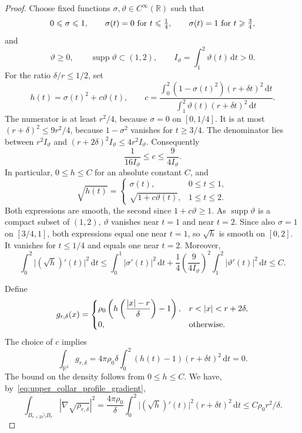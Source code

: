 \documentclass[final,reqno]{amsart}
\DeclareMathOperator{\supp}{supp}
\theoremstyle{remark}
\theoremstyle{definition}
\renewcommand{\le}{\leqslant}
\renewcommand{\ge}{\geqslant}
\newcommand{\RR}{\mathbb{R}}
\begin{document}
\begin{proof}
Choose fixed functions $\sigma,\vartheta\in C^\infty(\RR)$ such that
\[
0\le \sigma\le1,
\qquad \sigma(t)=0\ \hbox{for }t\le\tfrac14,
\qquad \sigma(t)=1\ \hbox{for }t\ge\tfrac34,
\]
and
\[
\vartheta\ge0,
\qquad \supp\vartheta\subset(1,2),
\qquad I_\vartheta=\int_1^2\vartheta(t)\,\mathrm dt>0.
\]
For the ratio $\delta/r\le1/2$, set
\begin{equation}\label{eq:upper_collar_coefficient}
 h(t)=\sigma(t)^2+c\vartheta(t),
 \qquad
 c=
 \frac{\displaystyle\int_0^2(1-\sigma(t)^2)(r+\delta t)^2\,\mathrm dt}
 {\displaystyle\int_1^2\vartheta(t)(r+\delta t)^2\,\mathrm dt}.
\end{equation}
The numerator is at least $r^2/4$, because $\sigma=0$ on $[0,1/4]$. It is at most $(r+\delta)^2\le9r^2/4$, because $1-\sigma^2$ vanishes for $t\ge3/4$. The denominator lies between $r^2I_\vartheta$ and $(r+2\delta)^2I_\vartheta\le4r^2I_\vartheta$. Consequently
\begin{equation}\label{eq:upper_collar_uniform_coefficient}
\frac1{16I_\vartheta}\le c\le\frac9{4I_\vartheta}.
\end{equation}
In particular, $0\le h\le C$ for an absolute constant $C$, and
\[
\sqrt{h(t)}=
\begin{cases}
\sigma(t),&0\le t\le1,\\
\sqrt{1+c\vartheta(t)},&1\le t\le2.
\end{cases}
\]
Both expressions are smooth, the second since $1+c\vartheta\ge1$. As $\supp\vartheta$ is a compact subset of $(1,2)$, $\vartheta$ vanishes near $t=1$ and near $t=2$. Since also $\sigma=1$ on $[3/4,1]$, both expressions equal one near $t=1$, so $\sqrt h$ is smooth on $[0,2]$. It vanishes for $t\le1/4$ and equals one near $t=2$. Moreover,
\begin{equation}\label{eq:upper_collar_profile_gradient}
\int_0^2\big|(\sqrt h)'(t)\big|^2\,\mathrm dt
\le\int_0^1|\sigma'(t)|^2\,\mathrm dt
+\frac14\left(\frac9{4I_\vartheta}\right)^2
\int_1^2|\vartheta'(t)|^2\,\mathrm dt
\le C.
\end{equation}

Define
\[
g_{r,\delta}(x)=
\begin{cases}
\rho_0\left(h\left(\dfrac{|x|-r}{\delta}\right)-1\right),&r<|x|<r+2\delta,\\
0,&\hbox{otherwise}.
\end{cases}
\]
The choice of $c$ implies
\[
\int_{\RR^3}g_{r,\delta}
=4\pi\rho_0\delta\int_0^2(h(t)-1)(r+\delta t)^2\,\mathrm dt=0.
\]
The bound on the density follows from $0\le h\le C$. We have, by~\eqref{eq:upper_collar_profile_gradient},
\[
\int_{B_{r+2\delta}\setminus B_r}|\nabla\sqrt{\rho_{r,\delta}}|^2
=\frac{4\pi\rho_0}{\delta}
\int_0^2\big|(\sqrt h)'(t)\big|^2(r+\delta t)^2\,\mathrm dt
\le C\rho_0r^2/\delta.
\]


\end{proof}
\end{document}
